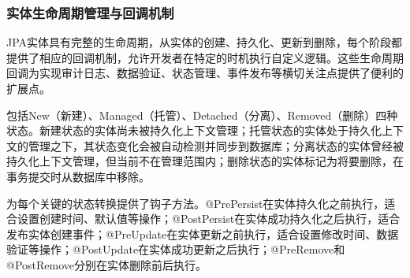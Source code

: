 \hypertarget{ux5b9eux4f53ux751fux547dux5468ux671fux7ba1ux7406ux4e0eux56deux8c03ux673aux5236}{%
\subsubsection{实体生命周期管理与回调机制}\label{ux5b9eux4f53ux751fux547dux5468ux671fux7ba1ux7406ux4e0eux56deux8c03ux673aux5236}}

JPA实体具有完整的生命周期，从实体的创建、持久化、更新到删除，每个阶段都提供了相应的回调机制，允许开发者在特定的时机执行自定义逻辑。这些生命周期回调为实现审计日志、数据验证、状态管理、事件发布等横切关注点提供了便利的扩展点。

包括New（新建）、Managed（托管）、Detached（分离）、Removed（删除）四种状态。新建状态的实体尚未被持久化上下文管理；托管状态的实体处于持久化上下文的管理之下，其状态变化会被自动检测并同步到数据库；分离状态的实体曾经被持久化上下文管理，但当前不在管理范围内；删除状态的实体标记为将要删除，在事务提交时从数据库中移除。

为每个关键的状态转换提供了钩子方法。@PrePersist在实体持久化之前执行，适合设置创建时间、默认值等操作；@PostPersist在实体成功持久化之后执行，适合发布实体创建事件；@PreUpdate在实体更新之前执行，适合设置修改时间、数据验证等操作；@PostUpdate在实体成功更新之后执行；@PreRemove和@PostRemove分别在实体删除前后执行。

